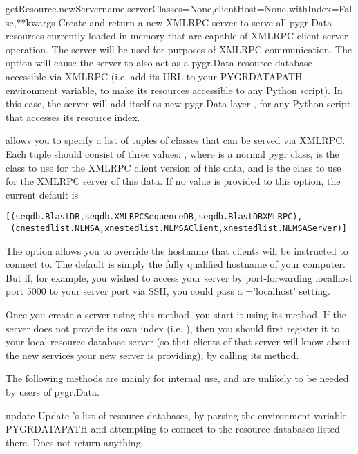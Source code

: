 \documentclass{howto}
\begin{document}
\begin{funcdesc}{getResource.newServer}{name,serverClasses=None,clientHost=None,withIndex=False,**kwargs}
  Create and return a new XMLRPC server to serve all pygr.Data resources 
  currently loaded in memory that are capable of XMLRPC client-server
  operation.  The server  will be used for 
  purposes of XMLRPC communication.  The  option
  will cause the server to also act as a pygr.Data resource database
  accessible via XMLRPC (i.e. add its URL to your PYGRDATAPATH environment
  variable, to make its resources accessible to any Python script).
  In this case, the server will add itself as new pygr.Data layer
  , for any Python script that accesses its resource index.

   allows you to specify a list of tuples of
  classes that can be served via XMLRPC.  Each tuple should consist of
  three values: , where 
   is a normal pygr class,  is the 
  class to use for the XMLRPC client version of this data, and
   is the class to use for the XMLRPC server of
  this data.  If no value is provided to this option, the current
  default is 
\begin{verbatim}
[(seqdb.BlastDB,seqdb.XMLRPCSequenceDB,seqdb.BlastDBXMLRPC),
 (cnestedlist.NLMSA,xnestedlist.NLMSAClient,xnestedlist.NLMSAServer)] 
\end{verbatim}
  The  option allows you to override the hostname
  that clients will be instructed to connect to.  The default is simply
  the fully qualified hostname of your computer.  But if, for example,
  you wished to access your server by port-forwarding localhost port 5000
  to your server port via SSH, you could pass a ='localhost'
  setting.

  Once you create a server using this method, you start it using its
   method.  If the server does not provide its
  own index (i.e. ), then you should first register
  it to your local resource database server (so that clients of that server
  will know about the new services your new server is providing), by
  calling its  method.
\end{funcdesc}

The following methods are mainly for internal use, and are unlikely to be
needed by users of pygr.Data.
\begin{funcdesc}{update}{}
  Update 's list of resource databases, by parsing the environment
  variable PYGRDATAPATH and attempting to connect to the resource databases
  listed there.  Does not return anything.
\end{funcdesc}
\end{document}
